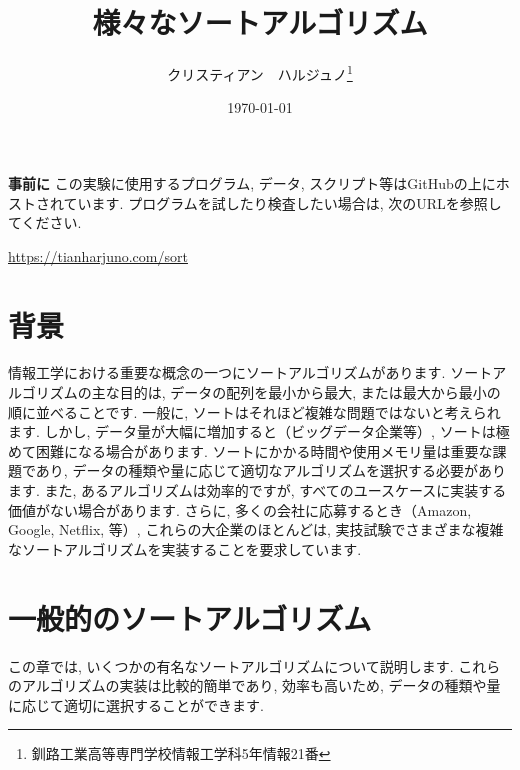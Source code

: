 \documentclass[a4j]{jarticle}
\title{様々なソートアルゴリズム}
\author{クリスティアン　ハルジュノ\thanks{釧路工業高等専門学校情報工学科5年情報21番}}
\date{\today}
\begin{document}
\maketitle 
\textbf{事前に} この実験に使用するプログラム, データ, スクリプト等はGitHubの上にホストされています. プログラムを試したり検査したい場合は, 次のURLを参照してください. \\
\begin{center}
  \url{https://tianharjuno.com/sort}
\end{center}
\section{背景}
情報工学における重要な概念の一つにソートアルゴリズムがあります. ソートアルゴリズムの主な目的は, データの配列を最小から最大, または最大から最小の順に並べることです. 一般に, ソートはそれほど複雑な問題ではないと考えられます. しかし, データ量が大幅に増加すると（ビッグデータ企業等）, ソートは極めて困難になる場合があります. ソートにかかる時間や使用メモリ量は重要な課題であり, データの種類や量に応じて適切なアルゴリズムを選択する必要があります. また, あるアルゴリズムは効率的ですが, すべてのユースケースに実装する価値がない場合があります. さらに, 多くの会社に応募するとき（Amazon, Google, Netflix, 等）, これらの大企業のほとんどは, 実技試験でさまざまな複雑なソートアルゴリズムを実装することを要求しています.\\
\section{一般的のソートアルゴリズム}
この章では, いくつかの有名なソートアルゴリズムについて説明します. これらのアルゴリズムの実装は比較的簡単であり, 効率も高いため, データの種類や量に応じて適切に選択することができます. \\
\end{document}
